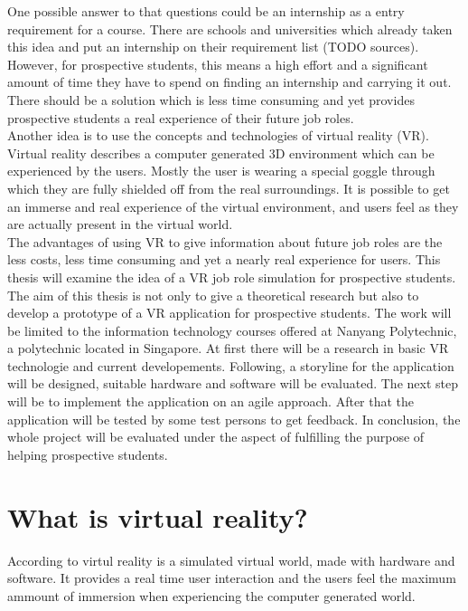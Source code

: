 One possible answer to that questions could be an internship as a entry requirement for a course. There are schools and universities which already taken this idea and put an internship on their requirement list (TODO sources). However, for prospective students, this means a high effort and a significant amount of time they have to spend on finding an internship and carrying it out. There should be a solution which is less time consuming and yet provides prospective students a real experience of their future job roles.\\
Another idea is to use the concepts and technologies of virtual reality (VR). Virtual reality describes a computer generated 3D environment which can be experienced by the users. Mostly the user is wearing a special goggle through which they are fully shielded off from the real surroundings. It is possible to get an immerse and real experience of the virtual environment, and users feel as they are actually present in the virtual world. \cite{Linowes.2015}\\
The advantages of using VR to give information about future job roles are the less costs, less time consuming and yet a nearly real experience for users. This thesis will examine the idea of a VR job role simulation for prospective students. The aim of this thesis is not only to give a theoretical research but also to develop a prototype of a VR application for prospective students. The work will be limited to the information technology courses offered at Nanyang Polytechnic, a polytechnic located in Singapore. At first there will be a  research in basic VR technologie and current developements. Following, a storyline for the application will be designed, suitable hardware and software will be evaluated. The next step will be to implement the application on an agile approach. After that the application will be tested by some test persons to get feedback. In conclusion, the whole project will be evaluated under the aspect of fulfilling the purpose of helping prospective students.

\section{What is virtual reality?}
According to \cite{Fuchs.2011} virtul reality is a simulated virtual world, made with hardware and software. It provides a real time user interaction and the users feel the maximum ammount of immersion when experiencing the computer generated world.
